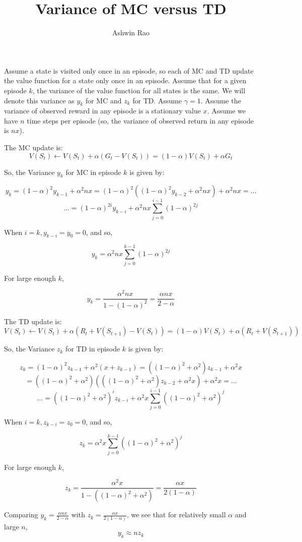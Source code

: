 \documentclass[12pt]{amsart}
\title{Variance of MC versus TD}
\author{Ashwin Rao}
\date{} %
\begin{document}
\maketitle
Assume a state is visited only once in an episode, so each of MC and TD update the value function for a state only once in an episode. Assume that for a given episode $k$, the variance of the value function for all states is the same. We will denote this variance as $y_k$ for MC and $z_k$ for TD. Assume $\gamma = 1$. Assume the variance of observed reward in any episode is a stationary value $x$. Assume we have $n$ time steps per episode (so, the variance of observed return in any episode is $nx$).

The MC update is:
$$V(S_t) \leftarrow V(S_t) + \alpha (G_t - V(S_t)) = (1-\alpha) V(S_t) + \alpha G_t$$

So, the Variance $y_k$ for MC in episode $k$ is given by:

$$y_k = (1-\alpha)^2 y_{k-1} + \alpha^2 nx = (1-\alpha)^2 ((1-\alpha)^2 y_{k-2} + \alpha^2 nx) + \alpha^2 nx = \ldots $$
$$ \ldots = (1-\alpha)^{2i} y_{k-i} + \alpha^2 nx\sum_{j=0}^{i-1} (1-\alpha)^{2j}$$

When $i=k, y_{k-i} = y_0 = 0$, and so,

$$y_k = \alpha^2 nx\sum_{j=0}^{k-1} (1-\alpha)^{2j}$$

For large enough $k$,

$$y_k = \frac {\alpha^2 nx} {1 - (1-\alpha)^2} = \frac {\alpha nx} {2 - \alpha}$$

The TD update is:
$$V(S_t) \leftarrow V(S_t) + \alpha (R_t + V(S_{t+1}) - V(S_t)) = (1-\alpha)V(S_t) + \alpha (R_t + V(S_{t+1}))$$

So, the Variance $z_k$ for TD in episode $k$ is given by:

$$z_k = (1-\alpha)^2 z_{k-1} + \alpha^2 (x + z_{k-1}) = ((1-\alpha)^2 + \alpha^2) z_{k-1}+ \alpha^2 x $$
$$ = ((1-\alpha)^2 +\alpha^2) (((1-\alpha)^2 +\alpha^2) z_{k-2} + \alpha^2 x) + \alpha^2 x = \ldots$$
$$ \ldots = ((1-\alpha)^2 + \alpha^2)^i z_{k-i} + \alpha^2 x \sum_{j=0}^{i-1} ((1-\alpha)^2 + \alpha^2)^j$$

When $i=k, z_{k-i} = z_0 = 0$, and so,

$$z_k = \alpha^2 x \sum_{j=0}^{k-1} ((1-\alpha)^2 + \alpha^2)^j$$

For large enough $k$,

$$z_k = \frac {\alpha^2 x} {1 - ((1-\alpha)^2 + \alpha^2)} = \frac {\alpha x} {2(1-\alpha)}$$

Comparing $y_k = \frac {\alpha nx} {2 - \alpha}$ with $z_k = \frac {\alpha x} {2(1-\alpha)}$, we see that for relatively small $\alpha$ and large $n$, 
$$y_k \approx n z_k$$
\end{document}
